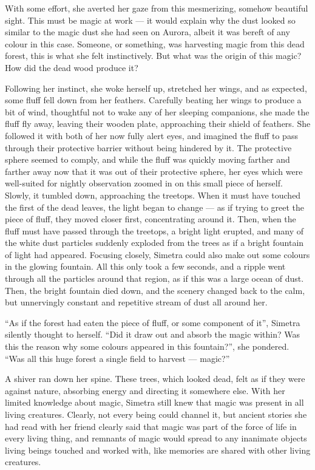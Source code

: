 With some effort, she averted her gaze from this mesmerizing, somehow beautiful sight. This must be magic at work --- it would explain why the dust looked so similar to the magic dust she had seen on Aurora, albeit it was bereft of any colour in this case. Someone, or something, was harvesting magic from this dead forest, this is what she felt instinctively. But what was the origin of this magic? How did the dead wood produce it?

Following her instinct, she woke herself up, stretched her wings, and as expected, some fluff fell down from her feathers. Carefully beating her wings to produce a bit of wind, thoughtful not to wake any of her sleeping companions, she made the fluff fly away, leaving their wooden plate, approaching their shield of feathers. She followed it with both of her now fully alert eyes, and imagined the fluff to pass through their protective barrier without being hindered by it. The protective sphere seemed to comply, and while the fluff was quickly moving farther and farther away now that it was out of their protective sphere, her eyes which were well-suited for nightly observation zoomed in on this small piece of herself. Slowly, it tumbled down, approaching the treetops. When it must have touched the first of the dead leaves, the light began to change --- as if trying to greet the piece of fluff, they moved closer first, concentrating around it. Then, when the fluff must have passed through the treetops, a bright light erupted, and many of the white dust particles suddenly exploded from the trees as if a bright fountain of light had appeared. Focusing closely, Simetra could also make out some colours in the glowing fountain. All this only took a few seconds, and a ripple went through all the particles around that region, as if this was a large ocean of dust. Then, the bright fountain died down, and the scenery changed back to the calm, but unnervingly constant and repetitive stream of dust all around her.

\enquote{As if the forest had eaten the piece of fluff, or some component of it}, Simetra silently thought to herself. \enquote{Did it draw out and absorb the magic within? Was this the reason why some colours appeared in this fountain?}, she pondered. \enquote{Was all this huge forest a single field to harvest --- magic?}

A shiver ran down her spine. These trees, which looked dead, felt as if they were against nature, absorbing energy and directing it somewhere else. With her limited knowledge about magic, Simetra still knew that magic was present in all living creatures. Clearly, not every being could channel it, but ancient stories she had read with her friend clearly said that magic was part of the force of life in every living thing, and remnants of magic would spread to any inanimate objects living beings touched and worked with, like memories are shared with other living creatures.

